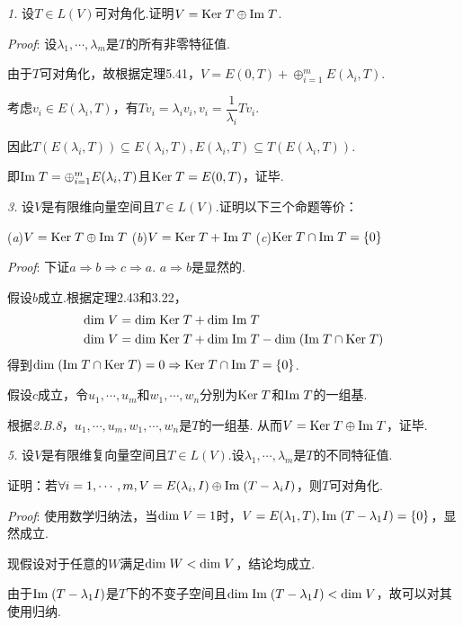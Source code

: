 \textit{1.}
设$T \in L(V)$可对角化.证明$V=\mathrm{Ker \;} T \oplus \mathrm{Im \;} T$.

\textit{Proof}:
设$\lambda_1,\cdots,\lambda_m$是$T$的所有非零特征值.

由于$T$可对角化，故根据定理5.41，$V=E(0,T)+\oplus_{i=1}^m E(\lambda_i,T)$.

考虑$v_i \in E(\lambda_i,T)$，有$Tv_i=\lambda_iv_i,v_i=\dfrac{1}{\lambda_i}Tv_i$.

因此$T(E(\lambda_i,T)) \subseteq E(\lambda_i,T),E(\lambda_i,T) \subseteq T(E(\lambda_i,T))$.

即$\mathrm{Im \;} T=\oplus_{i=1}^m E(\lambda_i,T)$且$\mathrm{Ker \;} T=E(0,T)$，证毕.

\hspace*{\fill}

\textit{3.}
设$V$是有限维向量空间且$T \in L(V)$.证明以下三个命题等价：

(\textit{a})$V=\mathrm{Ker \;} T \oplus \mathrm{Im \;} T$ \quad
(\textit{b})$V=\mathrm{Ker \;} T+\mathrm{Im \;} T$ \quad
(\textit{c})$\mathrm{Ker \;} T \cap \mathrm{Im \;} T=\{0\}$

\textit{Proof}:
下证$a \Rightarrow b \Rightarrow c \Rightarrow a$.
$a \Rightarrow b$是显然的.

假设$b$成立.根据定理2.43和3.22，
    \begin{align*}
        \mathrm{dim \;} V &= \mathrm{dim \;} \mathrm{Ker \;} T+\mathrm{dim \;} \mathrm{Im \;} T \\
        \mathrm{dim \;} V &= \mathrm{dim \;} \mathrm{Ker \;} T+\mathrm{dim \;} \mathrm{Im \;} T-\mathrm{dim \;} (\mathrm{Im \;} T \cap \mathrm{Ker \;} T)
    \end{align*}
得到$\mathrm{dim \;} (\mathrm{Im \;} T \cap \mathrm{Ker \;} T)=0 \Rightarrow \mathrm{Ker \;} T \cap \mathrm{Im \;} T=\{0\}$.

假设$c$成立，令$u_1,\cdots,u_m$和$w_1,\cdots,w_n$分别为$\mathrm{Ker \;} T$和$\mathrm{Im \;} T$的一组基.

根据\textit{2.B.8}，$u_1,\cdots,u_m,w_1,\cdots,w_n$是$T$的一组基.
从而$V=\mathrm{Ker \;} T \oplus \mathrm{Im \;} T$，证毕.

\hspace*{\fill}

\textit{5.}
设$V$是有限维复向量空间且$T \in L(V)$.设$\lambda_1,\cdots,\lambda_m$是$T$的不同特征值.

证明：若$\forall i=1,\cdots,m,V=E(\lambda_i,I) \oplus \mathrm{Im \;}(T-\lambda_i I)$，则$T$可对角化.

\textit{Proof}:
使用数学归纳法，当$\mathrm{dim \;} V=1$时，$V=E(\lambda_1,T),\mathrm{Im \;}(T-\lambda_1 I)=\{0\}$，显然成立.

现假设对于任意的$W$满足$\mathrm{dim \;} W<\mathrm{dim \;} V$，结论均成立.

由于$\mathrm{Im \;}(T-\lambda_1 I)$是$T$下的不变子空间且$\mathrm{dim \;} \mathrm{Im \;}(T-\lambda_1 I)<\mathrm{dim \;} V$，故可以对其使用归纳.

